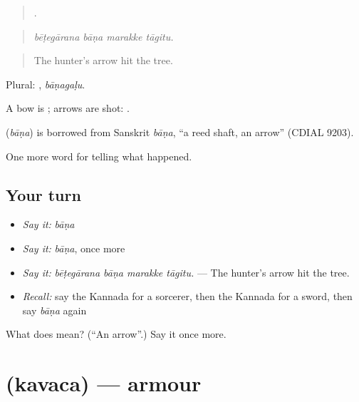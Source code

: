 \begin{quote}
   .
\end{quote}

\begin{quote}
\emph{bēṭegārana bāṇa marakke tāgitu.}
\end{quote}

\begin{quote}
The hunter's arrow hit the tree.
\end{quote}

Plural: , \emph{bāṇagaḷu}.

A bow is ; arrows are shot:  .

\begin{cousinweb}
\textbf{} (\emph{bāṇa}) is borrowed from Sanskrit \emph{bāṇa}, \textquotedblleft{}a reed shaft, an arrow\textquotedblright{} (CDIAL 9203).
\end{cousinweb}

\begin{grammarlens}[title={What you've built}]
One more word for telling what happened.
\end{grammarlens}

\subsection*{Your turn}
\begin{itemize}
\raggedright
  \item \emph{Say it:} \emph{bāṇa}
  \item \emph{Say it:} \emph{bāṇa}, once more
  \item \emph{Say it:} \emph{bēṭegārana bāṇa marakke tāgitu.} — The hunter's arrow hit the tree.
  \item \emph{Recall:} say the Kannada for a sorcerer, then the Kannada for a sword, then say \emph{bāṇa} again
\end{itemize}

\begin{tcolorbox}[breakable,colback=teal!4,colframe=teal!35!black,title={Before you move on}]
What does  mean? (\textquotedblleft{}An arrow\textquotedblright{}.) Say it once more.
\end{tcolorbox}
\section[\texorpdfstring{\kn{ಕವಚ} (kavaca)}{ಕವಚ (kavaca)}]{ (kavaca) — armour}

